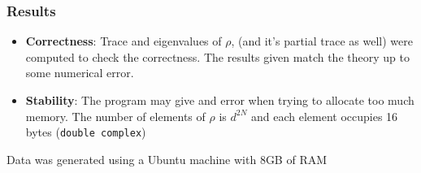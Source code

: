 \documentclass[pt12]{beamer}
\begin{document}
\begin{frame}[label=Results]
	\frametitle{Results}
	\tableofcontents[pausesections]
	\begin{itemize}
		\item \textbf{Correctness}: Trace and eigenvalues of $\rho$, (and it's partial trace as well) were computed to check the correctness. The results given match the theory up to some numerical error.
		\item \textbf{Stability}: The program may give and error when trying to allocate too much memory. The number of elements of $\rho$ is $d^{2N}$ and each element occupies 16 bytes (\texttt{double complex})
		\begin{figure}[h]
		\centering
		\hspace{-1cm}
		\end{figure}
	\end{itemize}
	\tiny{Data was generated using a Ubuntu machine with 8GB of RAM}
\end{frame}


\end{document}
